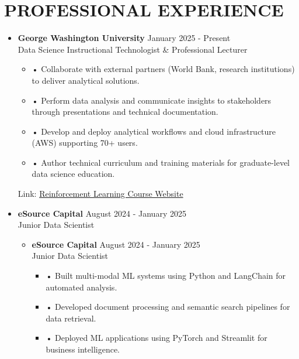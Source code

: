 \documentclass[a4paper,9pt]{extarticle}
\begin{document}

\section*{PROFESSIONAL EXPERIENCE}

\begin{itemize}[leftmargin=0.4cm, label={}]
    \item \textbf{George Washington University} \hfill January 2025 - Present \\
    Data Science Instructional Technologist \& Professional Lecturer
    \vspace{-0.1cm}
    \begin{itemize}[leftmargin=0.3cm, label={}]
    \item \small{•} \normalsize{Collaborate with external partners (World Bank, research institutions) to deliver analytical solutions.}
    \item \small{•} \normalsize{Perform data analysis and communicate insights to stakeholders through presentations and technical documentation.}
    \item \small{•} \normalsize{Develop and deploy analytical workflows and cloud infrastructure (AWS) supporting 70+ users.}
    \item \small{•} \normalsize{Author technical curriculum and training materials for graduate-level data science education.}
    \end{itemize}
    Link: \href{https://twallett.com/courses/reinforcement-learning/}{Reinforcement Learning Course Website}
\end{itemize}

\noindent
\begin{itemize}[leftmargin=0.4cm, label={}]
    \item \textbf{eSource Capital} \hfill August 2024 - January 2025 \\
    Junior Data Scientist 
    \vspace{-0.1cm}
    \begin{itemize}[leftmargin=0.3cm, label={}]
\item \textbf{eSource Capital} \hfill August 2024 - January 2025 \\ Junior Data Scientist
\vspace{-0.1cm}
\begin{itemize}[leftmargin=0.3cm, label={}]
\item \small{•} \normalsize{Built multi-modal ML systems using Python and LangChain for automated analysis.}
\item \small{•} \normalsize{Developed document processing and semantic search pipelines for data retrieval.}
\item \small{•} \normalsize{Deployed ML applications using PyTorch and Streamlit for business intelligence.}
\end{itemize}
    \end{itemize}
\end{itemize}
\end{document}
